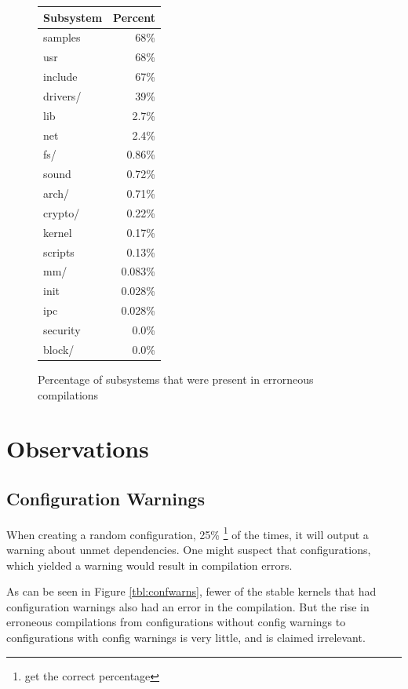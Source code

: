 \documentclass[a4paper,11pt]{report}
\newcommand{\figa}{
    \begin{figure}[!htpb]
    \centering
}
\newcommand{\figb}[2]{
    \caption{#1}
    \label{#2}
    \end{figure}
}
\begin{document}
\figa
    \begin{tabular}{l|r}
        \hline
        \hline
        \textbf{Subsystem} & \textbf{Percent} \\
        \hline
        
        samples & 68\%\\
        usr     & 68\%\\
        include & 67\%\\
        drivers/    &   39\% \\
        lib     & 2.7\%\\
        net     & 2.4\%\\
        fs/         & 0.86\% \\
        sound   & 0.72\%\\
        arch/   & 0.71\%\\
        crypto/ & 0.22\%\\
        kernel  & 0.17\%\\
        scripts & 0.13\%\\
        mm/ & 0.083\% \\
        init    & 0.028\%\\
        ipc     & 0.028\%\\
        security & 0.0\%\\
        block/  & 0.0\%\\

        \hline
        \hline
        
    \end{tabular}
\figb{Percentage of subsystems that were present in errorneous compilations}{}





\iffalse %

\section{Observations}


    \subsection{Configuration Warnings}
When creating a random configuration, 25\%
    \footnote{get the correct percentage}
of the times, it will output a warning about unmet dependencies. One might
suspect that configurations, which yielded a warning would result in
compilation errors. 

As can be seen in Figure \ref{tbl:confwarns}, fewer of the stable kernels that 
had configuration warnings also had an error in the compilation. But the rise 
in erroneous compilations from configurations without config warnings to 
configurations with config warnings is very little, and is claimed irrelevant.
\end{document}
